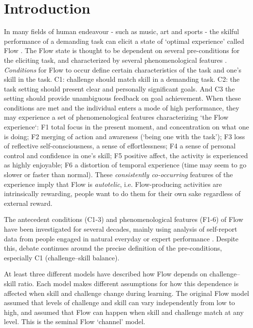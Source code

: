 \documentclass{frontierstyle/frontiersSCNS}
\newcommand{\hl}{\textcolor{red!80}}
\begin{document}
\section{Introduction}

In many fields of human endeavour - such as music, art and sports - the skilful performance of a demanding task can elicit a state of `optimal experience' called Flow \citep{Csikszentmihalyi1975}. \hl{The Flow state is thought to be dependent on several pre-conditions for the eliciting task, and characterized by several phenomenological features \citep{Nakamura2002,Engeser2012intro,Keller2012}. {\it Conditions} for Flow to occur define certain characteristics of the task and one's skill in the task}. {\sf C1}: challenge \hl{should} match skill in a demanding task. {\sf C2}: \hl{the task setting should present} clear and personally significant goals. And {\sf C3} \hl{the setting should provide} unambiguous feedback on goal achievement. When these conditions are met and the individual enters a mode of high performance, they may experience a set of phenomenological features \hl{characterizing `the Flow experience`}: {\sf F1} total focus in the present moment, and concentration on what one is doing; {\sf F2} merging of action and awareness (`being one with the task'); {\sf F3} loss of reflective self-consciousness, a sense of effortlessness; {\sf F4} a sense of personal control and confidence in one's skill; {\sf F5} positive affect, the activity is experienced as highly enjoyable; {\sf F6} a distortion of temporal experience (time may seem to go slower or faster than normal). These {\it consistently co-occurring} features of the experience imply that Flow is {\it autotelic}, i.e. Flow-producing activities are intrinsically rewarding, people want to do them for their own sake regardless of external reward.

The antecedent conditions ({\sf C1-3}) and phenomenological features ({\sf F1-6}) of Flow have been investigated for several decades, mainly using analysis of self-report data from people engaged in natural everyday or expert performance \citep{Csikszentmihalyi1971,Moneta2012}. Despite this, debate continues around the precise definition of the pre-conditions, especially {\sf C1} (challenge--skill balance). %

\hl{At least three different models have described how Flow depends on challenge--skill ratio. Each model makes different assumptions for how this dependence is affected when skill and challenge change during learning. The original Flow model \citep{Csikszentmihalyi1975} assumed that levels of challenge and skill can vary independently from low to high, and assumed that Flow can happen when skill and challenge match at any level. This is the seminal Flow `channel' model.}
\end{document}
